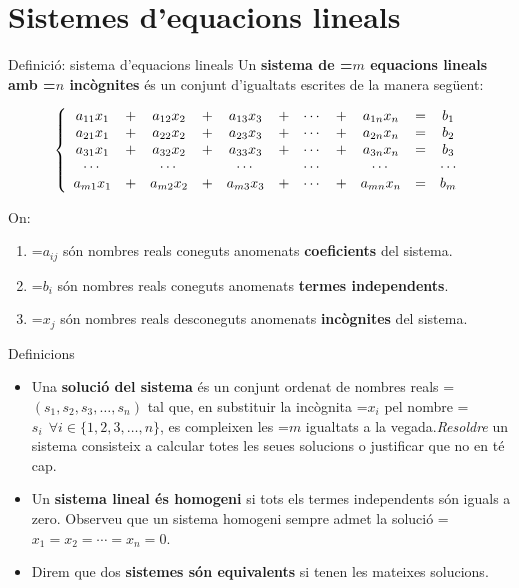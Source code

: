 \documentclass[11pt,a4paper]{article}
\newcommand{\fmm}[1]{\setbox0=\hbox{$#1$}\ifdim\wd0>\linewidth\fmdisp{#1}\else\mbox{\box0}\fi}
\newcommand{\fmdisp}[1]{\[\setbox2=\hbox{$\displaystyle #1$}\ifdim\wd2>\linewidth\resizebox{\linewidth}{!}{\box2}\else\box2\fi\]}
\begin{document}
\section{Sistemes d'equacions lineals}\hypertarget{sec1}{}

\begin{fmdef}{Definició: sistema d'equacions lineals}
Un \textbf{sistema de \fmm{m} equacions lineals amb \fmm{n} incògnites} és un conjunt d'igualtats escrites de la manera següent:

\fmdisp{\left\{\begin{array}{ccccccccccc} a_{11}x_1 &+& a_{12}x_2 &+& a_{13}x_3 &+& \cdots &+& a_{1n}x_n &=& b_1\\ a_{21}x_1 &+& a_{22}x_2 &+& a_{23}x_3 &+& \cdots &+& a_{2n}x_n &=& b_2\\ a_{31}x_1 &+& a_{32}x_2 &+& a_{33}x_3 &+& \cdots &+& a_{3n}x_n &=& b_3\\ \cdots && \cdots && \cdots && \cdots && \cdots && \cdots\\ a_{m1}x_1 &+& a_{m2}x_2 &+& a_{m3}x_3 &+& \cdots &+& a_{mn}x_n &=& b_m\end{array}\right.}

On:

\begin{enumerate}
\item \fmm{a_{ij}} són nombres reals coneguts anomenats \textbf{coeficients} del sistema.
\item \fmm{b_i} són nombres reals coneguts anomenats \textbf{termes independents}.
\item \fmm{x_j} són nombres reals desconeguts anomenats \textbf{incògnites} del sistema.
\end{enumerate}
\end{fmdef}

\begin{fmdef}{Definicions}
\begin{itemize}
\item Una \textbf{solució del sistema} és un conjunt ordenat de nombres reals \fmm{(s_1,s_2,s_3,\dots,s_n)} tal que, en substituir la incògnita \fmm{x_i} pel nombre \fmm{s_i\ \ \forall i\in\{1,2,3,\dots,n\}}, es compleixen les \fmm{m} igualtats a la vegada.\newline \emph{Resoldre} un sistema consisteix a calcular totes les seues solucions o justificar que no en té cap.
\item Un \textbf{sistema lineal és homogeni} si tots els termes independents són iguals a zero. Observeu que un sistema homogeni sempre admet la solució \fmm{x_1=x_2=\cdots=x_n=0}.
\item Direm que dos \textbf{sistemes són equivalents} si tenen les mateixes solucions.
\end{itemize}
\end{fmdef}
\end{document}
